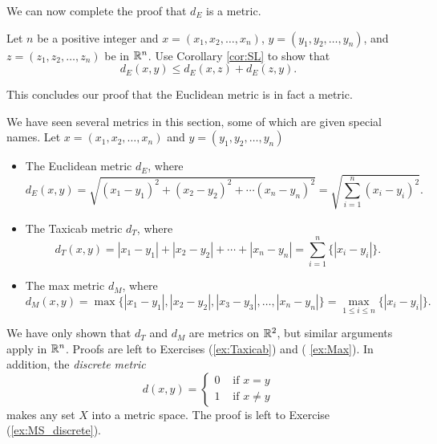 {We can now complete the proof that $d_E$ is a metric.

\begin{activity} Let $n$ be a positive integer and $x = (x_1, x_2, \ldots, x_n)$, $y=(y_1, y_2, \ldots, y_n)$, and $z=(z_1, z_2, \ldots, z_n)$ be in $\mathbb{R}^n$. Use Corollary \ref{cor:SL} to show that 
\[d_E(x,y) \leq d_E(x,z)+d_E(z,y).\]

\end{activity}

\begin{comment}

\ActivitySolution Now we can apply Corollary \ref{cor:SL} to verify that $d_E$ satisfies the triangle inequality.  Let $n$ be a positive integer and $x = (x_1, x_2, \ldots, x_n)$, $y=(y_1, y_2, \ldots, y_n)$ be in $\R^n$. Then
\begin{align*}
d_E(x,z) + d_E(z,y) &= \sqrt{\sum (x_i-z_i)^2} + \sqrt{\sum (z_i-y_i)^2} \\
	&\geq \sqrt{ \sum \left[(x_i-z_i)+(z_i-y_i)\right]^2}  \\
	&= \sqrt{ \sum (x_i-y_i)^2}  \\
	&= d_E(x,y).
\end{align*}

\end{comment}


This concludes our proof that the Euclidean metric is in fact a metric. 

We have seen several metrics in this section, some of which are given special names. Let $x = (x_1, x_2, \ldots, x_n)$ and $y = (y_1, y_2, \ldots, y_n)$
\begin{itemize}
\item The Euclidean metric $d_E$, where
\[d_E(x,y) = \sqrt{(x_1-y_1)^2 + (x_2-y_2)^2 + \cdots (x_n-y_n)^2} = \sqrt{\sum_{i=1}^n (x_i-y_i)^2}.\]
\item The Taxicab metric $d_T$, where 
\[d_T(x,y) = |x_1-y_1| + |x_2-y_2| + \cdots + |x_n-y_n| = \sum_{i=1}^n \{|x_i-y_i|\}.\]
\item The max metric $d_M$, where 
\[d_M(x,y) = \max\{| x_1-y_1 |, | x_2-y_2 |, |x_3-y_3|, \ldots, |x_n-y_n| \} = \max_{1 \leq i \leq n} \{|x_i-y_i|\}.\]
\end{itemize}
We have only shown that $d_T$ and $d_M$ are metrics on $\mathbb{R}^2$, but similar arguments apply in $\mathbb{R}^n$. Proofs are left to Exercises (\ref{ex:Taxicab}) and (
\ref{ex:Max}). In addition, the \emph{discrete metric}
\[d(x,y) = \begin{cases} 0 & \text{ if } x=y \\ 1 & \text{ if } x \neq y \end{cases}\]
makes any set $X$ into a metric space. The proof is left to Exercise (\ref{ex:MS_discrete}).

}
